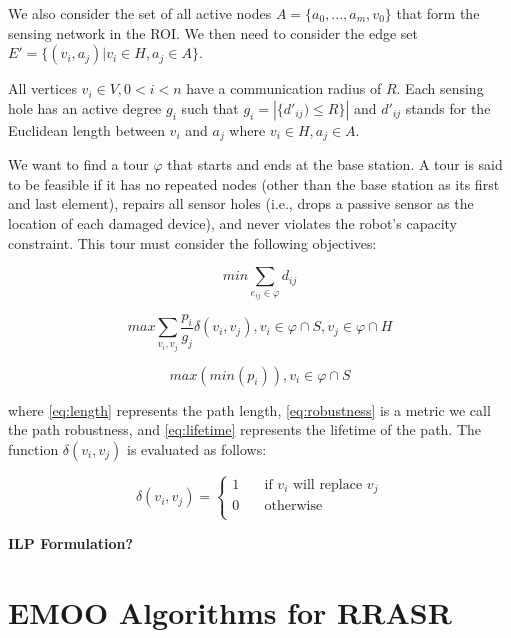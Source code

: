 \documentclass[conference]{IEEEtran}
\begin{document}
We also consider the set of all active nodes $A=\{a_0,...,a_m,v_0\}$ that form the sensing network in the ROI. We then need to consider the edge set $E'=\{(v_i,a_j)|v_i \in  H, a_j \in A\}$.

All vertices $v_i \in V, 0<i<n$ have a communication radius of $R$. Each sensing hole has an active degree $g_i$ such that $g_i = |\{d'_{ij}) \leq R\}|$ and $d'_{ij}$ stands for the Euclidean length  between $v_i$ and $a_j$ where $v_i \in H, a_j \in A$.

We want to find a tour $\varphi$ that starts and ends at the base station. A tour is said to be feasible if it has no repeated nodes (other than the base station as its first and last element), repairs all sensor holes (i.e., drops a passive sensor as the location of each damaged device), and never violates the robot’s capacity constraint. This tour must consider the following objectives:

\begin{equation} \label {eq:length}
min\sum_{e_{ij} \in \varphi} d_{ij}
\end{equation}

\begin{equation} \label {eq:robustness}
max \sum_{v_i,v_j}\frac{p_i}{g_j}\delta(v_i,v_j), v_i \in \varphi \cap S, v_j \in \varphi \cap H
\end{equation}


\begin{equation} \label {eq:lifetime}
max(min (p_i)), v_i \in \varphi \cap S
\end{equation}

where \eqref{eq:length} represents the path length, \eqref{eq:robustness} is a metric we call the path robustness, and \eqref{eq:lifetime} represents the lifetime of the path. The function $\delta(v_i,v_j)$ is evaluated as follows:

\begin{equation} \label {eq:dropoff}
\delta(v_i,v_j) = \left\{ \begin{array}{ll}
1 & \quad \text{if $v_i$ will replace $v_j$} \\
0 & \quad \text{otherwise} \\
\end{array} \right.
\end{equation}

\textbf{ILP Formulation?} \\

\section{EMOO Algorithms for RRASR}
\label{sec:Algorithms}
\end{document}
